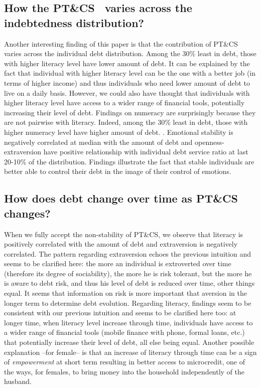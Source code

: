 \documentclass[a4paper, 11pt, onecolumn]{article}
\newcommand{\aebe}{all else being equal}
\newcommand{\ote}{other things equal}
\newcommand{\PTCS}{PT\&CS}
\begin{document}
	\subsection{How the \PTCS~ varies across the indebtedness distribution?}

Another interesting finding of this paper is that the contribution of \PTCS~ varies across the individual debt distribution.
Among the 30\% least in debt, those with higher literacy level have lower amount of debt.
It can be explained by the fact that individual with higher literacy level can be the one with a better job (in terms of higher income) and thus individuals who need lower amount of debt to live on a daily basis. 
However, we could also have thought that individuals with higher literacy level have access to a wider range of financial tools, potentially increasing their level of debt.
Findings on numeracy are surprisingly because they are not pairwise with literacy.
Indeed, among the 30\% least in debt, those with higher numeracy level have higher amount of debt.
.
Emotional stability is negatively correlated at median with the amount of debt and openness-extraversion have positive relationship with individual debt service ratio at last 20-10\% of the distribution.
Findings illustrate the fact that stable individuals are better able to control their debt in the image of their control of emotions.




	\subsection{How does debt change over time as \PTCS~ changes?}

When we fully accept the non-stability of \PTCS, we observe that literacy is positively correlated with the amount of debt and extraversion is negatively correlated.
The pattern regarding extraversion echoes the previous intuition and seems to be clarified here: the more an individual is extroverted over time (therefore its degree of sociability), the more he is risk tolerant, but the more he is aware to debt risk, and thus his level of debt is reduced over time, \ote.
It seems that information on risk is more important that aversion in the longer term to determine debt evolution.
Regarding literacy, findings seem to be consistent with our previous intuition and seems to be clarified here too: at longer time, when literacy level increase through time, individuals have access to a wider range of financial tools (mobile finance with phone, formal loans, etc.) that potentially increase their level of debt, \aebe.
Another possible explanation --for female-- is that an increase of literacy through time can be a sign of \textit{empowerment} at short term resulting in better access to microcredit, one of the ways, for females, to bring money into the household independently of the husband.
\end{document}
